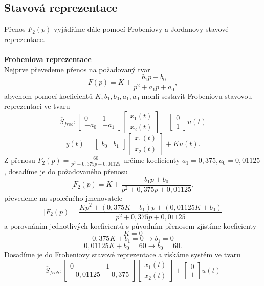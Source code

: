 \documentclass{article}
\begin{document}
		\subsection{Stavová reprezentace}
			Přenos \(F_{2}(p)\) vyjádříme dále pomocí Frobeniovy a Jordanovy stavové reprezentace.\\\\
			\textbf{Frobeniova reprezentace}\\
			Nejprve převedeme přenos na požadovaný tvar
				\[F(p)=K+\frac{b_{1}p+b_{0}}{p^{2}+a_{1}p+a_{0}},\]
			abychom pomocí koeficientů \(K,b_{1},b_{0},a_{1},a_{0}\) mohli sestavit Frobeniovu stavovou reprezentaci ve tvaru
				\[\overline{S}_{frob}:\begin{bmatrix}
					0&1\\
					-a_{0}&-a_{1}
				\end{bmatrix}
				\begin{bmatrix}
					x_{1}(t)\\
					x_{2}(t)
				\end{bmatrix}+
				\begin{bmatrix}
					0\\1
				\end{bmatrix}u(t)\]
				\[y(t)=\begin{bmatrix}
					b_{0}&b_{1}
				\end{bmatrix}
				\begin{bmatrix}
					x_{1}(t)\\
					x_{2}(t)
				\end{bmatrix}+Ku(t).\]
			Z přenosu \(F_{2}(p)=\frac{60}{p^2 + 0,375 p + 0,01125}\) určíme koeficienty 	\(a_{1}=0,375 ,a_{0}=0,01125\), dosadíme je do požadovaného přenosu
				\[[F_{2}(p)=K+\frac{b_{1}p+b_{0}}{p^{2}+0,375p+0,01125},\]
			převedeme na společného jmenovatele
				\[[F_{2}(p)=\frac{Kp^{2}+(0,375K+b_{1})p+(0,01125K+b_{0})}{p^{2}+0,375p+0,01125}\]
			a porovnáním jednotlivých koeficientů s původním přenosem zjistíme koeficienty
				\[K=0\]
				\[0,375K+b_{1}=0 \rightarrow b_{1}=0\]
				\[0,01125K+b_{0}=60 \rightarrow b_{0}=60.\]
			Dosadíme je do Frobeniovy stavové reprezentace a získáme systém ve tvaru
				\[\overline{S}_{frob}:\begin{bmatrix}
					0&1\\
					-0,01125&-0,375
				\end{bmatrix}
				\begin{bmatrix}
					x_{1}(t)\\
					x_{2}(t)
				\end{bmatrix}+
				\begin{bmatrix}
					0\\1
				\end{bmatrix}u(t)\]
\end{document}
